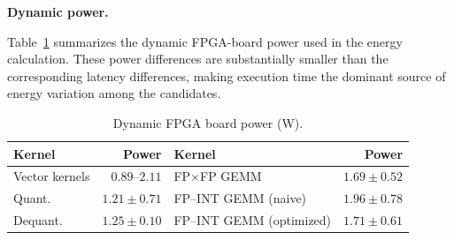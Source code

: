 \documentclass[sigconf,anonymous,nonacm]{acmart}
\newcommand{\fpint}{FP-INT}
\begin{document}
\textbf{Dynamic power.}

Table~\ref{tab:kernel-dynamic-power} summarizes the dynamic FPGA-board power used in the energy calculation.
These power differences are substantially smaller than the corresponding latency differences, making execution time the dominant source of energy variation among the candidates.

\begin{table}[t]
    \centering
    \caption{Dynamic FPGA board power (W).}
    \label{tab:kernel-dynamic-power}
    \setlength{\tabcolsep}{2.5pt}
    \begin{tabular*}{\columnwidth}
        {@{\extracolsep{\fill}}lrlr@{}}
        \toprule
        Kernel & Power & Kernel & Power \\
        \midrule
        Vector kernels & $0.89$--$2.11$
            & FP$\times$FP GEMM & $1.69 \pm 0.52$ \\
        Quant. & $1.21 \pm 0.71$
            & FP--INT GEMM (naive) & $1.96 \pm 0.78$ \\
        Dequant. & $1.25 \pm 0.10$
            & FP--INT GEMM (optimized) & $1.71 \pm 0.61$ \\
        \bottomrule
    \end{tabular*}
\end{table}
\end{document}
